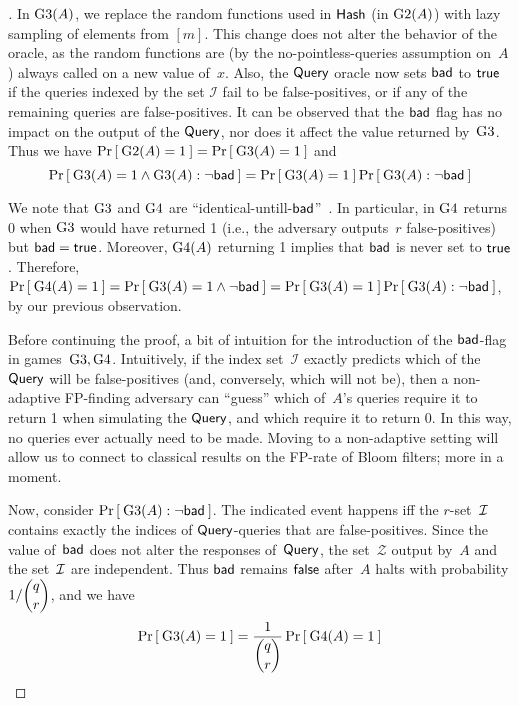 \begin{proof}[]
In $\text{G3}(A)$, we replace the random functions used in
$\mathsf{Hash}$ (in $\text{G2}(A)$) with lazy sampling of elements from
$[m]$.  This change does not alter the behavior of the oracle, as the
random functions are (by the no-pointless-queries assumption on~$A$) always called on a new
value of~$x$.
%
Also, the $\mathsf{Query}$ oracle now sets $\mathsf{bad}$ to $\mathsf{true}$ if the
queries indexed by the set $\mathcal{I}$ fail to be false-positives,
or if any of the remaining queries are false-positives. It can be
observed that the $\mathsf{bad}$ flag has no impact on the output of the
$\mathsf{Query}$, nor does it affect  the value returned
by~$\text{G3}$. Thus we have $\Pr\left[\: \text{G2}(A)=1 \:\right] =
\Pr\left[\: \text{G3}(A)=1 \:\right]$ and
\[
\Prob{\game{3}(A)=1 \wedge \game{3}(A): \neg\bad} = \Prob{\game{3}(A)=1} \Prob{\game{3}(A) : \neg\bad}%
\]

We note that $\text{G3}$ and $\text{G4}$ are
``identical-untill-$\mathsf{bad}$''~\cite{BeRo-gameplaying}.  In particular,
in $\text{G4}$ returns 0 when $\text{G3}$ would have returned 1 (i.e.,
the adversary outputs~$r$ false-positives) but $\mathsf{bad}=\mathsf{true}$.  
Moreover,  $\text{G4}(A)$ returning 1 implies that $\mathsf{bad}$ is never set to $\mathsf{true}$. Therefore,
$\Pr\left[\: \text{G4}(A)=1 \:\right] = \Pr\left[\: \text{G3}(A)=1 \wedge \neg\mathsf{bad} \:\right] =
\Pr\left[\: \text{G3}(A)=1 \:\right] \Pr\left[\: \text{G3}(A) : \neg\mathsf{bad} \:\right]$, by our previous observation.

Before continuing the proof, a bit of intuition for the introduction
of the $\mathsf{bad}$-flag in games~$\text{G3},\text{G4}$.   Intuitively, if the index
set~$\mathcal{I}$ exactly predicts which of the $\mathsf{Query}$ will be
false-positives (and, conversely, which will not be), then a
non-adaptive FP-finding adversary can ``guess'' which of~$A$'s queries require it
to return 1 when simulating the $\mathsf{Query}$, and which require it to
return 0.  In this way, no queries ever actually need to be made.
Moving to a non-adaptive setting will allow us to connect to classical
results on the FP-rate of Bloom filters; more in a moment. 

Now, consider $\Pr\left[\: \text{G3}(A) : \neg\mathsf{bad} \:\right]$.  The indicated event
happens iff the $r$-set~${\cal I}$ contains exactly the indices of
$\mathsf{Query}$-queries that are false-positives.  Since the value
of~$\mathsf{bad}$ does not alter the responses of~$\mathsf{Query}$, the
set~$\mathcal{Z}$ output by~$A$ and the set~${\cal I}$ are independent.
Thus $\mathsf{bad}$ remains $\mathsf{false}$ after~$A$ halts with probability
$1/\dbinom{q}{r}$, and we have 
\begin{equation*}
\Pr\left[\: \text{G3}(A)=1 \:\right] = \frac{1}{\dbinom{q}{r}}\Pr\left[\: \text{G4}(A)=1 \:\right]
\end{equation*}


\end{proof}
